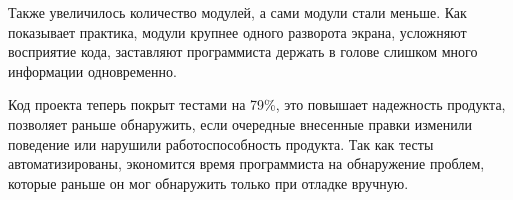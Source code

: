     Также увеличилось количество модулей, а сами модули стали меньше.
    Как показывает практика, модули крупнее одного разворота экрана, усложняют
    восприятие кода, заставляют программиста держать в голове слишком много
    информации одновременно.

    Код проекта теперь покрыт тестами на 79\%, это повышает надежность продукта,
    позволяет раньше обнаружить, если очередные внесенные правки
    изменили поведение или нарушили работоспособность продукта.
    Так как тесты автоматизированы, экономится время программиста на обнаружение
    проблем, которые раньше он мог обнаружить только при отладке вручную.
